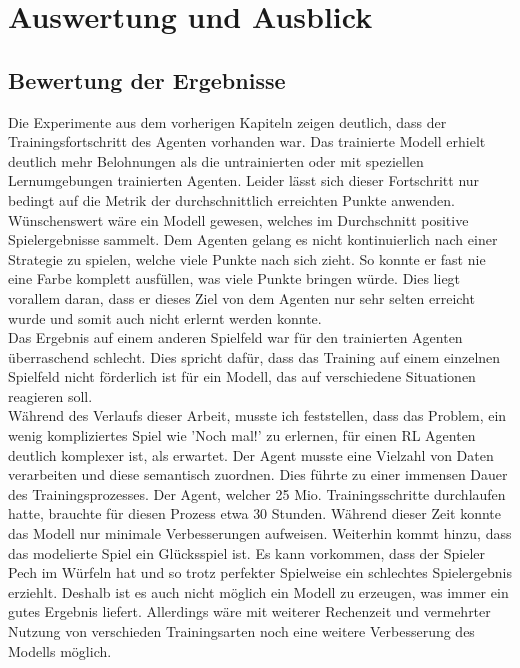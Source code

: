 

\clearpage
\chapter{Auswertung und Ausblick}

\section{Bewertung der Ergebnisse}

Die Experimente aus dem vorherigen Kapiteln zeigen deutlich, dass der Trainingsfortschritt des Agenten vorhanden war.
Das trainierte Modell erhielt deutlich mehr Belohnungen als die untrainierten oder mit speziellen Lernumgebungen trainierten Agenten. Leider lässt sich dieser Fortschritt nur bedingt auf die Metrik der durchschnittlich erreichten Punkte anwenden. Wünschenswert wäre ein Modell gewesen, welches im Durchschnitt positive Spielergebnisse sammelt. Dem Agenten gelang es nicht kontinuierlich nach einer Strategie zu spielen, welche viele Punkte nach sich zieht. So konnte er fast nie eine Farbe komplett ausfüllen, was viele Punkte bringen würde. Dies liegt vorallem daran, dass er dieses Ziel von dem Agenten nur sehr selten erreicht wurde und somit auch nicht erlernt werden konnte.\\
Das Ergebnis auf einem anderen Spielfeld war für den trainierten Agenten überraschend schlecht. Dies spricht dafür, dass das Training auf einem einzelnen Spielfeld nicht förderlich ist für ein Modell, das auf verschiedene Situationen reagieren soll. \\ Während des Verlaufs dieser Arbeit, musste ich feststellen, dass das Problem, ein wenig kompliziertes Spiel wie  'Noch mal!' zu erlernen, für einen RL Agenten deutlich komplexer ist, als erwartet. Der Agent musste eine Vielzahl von Daten verarbeiten und diese semantisch zuordnen. Dies führte zu einer immensen Dauer des Trainingsprozesses. Der Agent, welcher 25 Mio. Trainingsschritte durchlaufen hatte, brauchte für diesen Prozess etwa 30 Stunden. Während dieser Zeit konnte das Modell nur minimale Verbesserungen aufweisen. Weiterhin kommt hinzu, dass das modelierte Spiel ein Glücksspiel ist. Es kann vorkommen, dass der Spieler Pech im Würfeln hat und so trotz perfekter Spielweise ein schlechtes Spielergebnis erziehlt. Deshalb ist es auch nicht möglich ein Modell zu erzeugen, was immer ein gutes Ergebnis liefert. Allerdings wäre mit weiterer Rechenzeit und vermehrter Nutzung von verschieden Trainingsarten noch eine weitere Verbesserung des Modells möglich.

